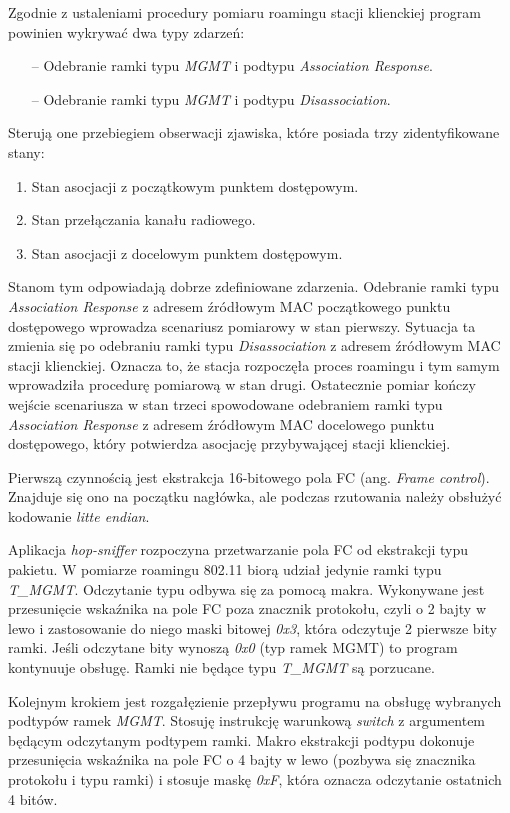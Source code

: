 Zgodnie z ustaleniami procedury pomiaru roamingu stacji klienckiej program powinien wykrywać dwa typy zdarzeń:
\begin{itemize}
\item[--] Odebranie ramki typu \emph{MGMT} i podtypu \emph{Association Response}.
\item[--] Odebranie ramki typu \emph{MGMT} i podtypu \emph{Disassociation}.
\end{itemize}
Sterują one przebiegiem obserwacji zjawiska, które posiada trzy zidentyfikowane stany:
\begin{enumerate}
\item Stan asocjacji z początkowym punktem dostępowym.
\item Stan przełączania kanału radiowego.
\item Stan asocjacji z docelowym punktem dostępowym.
\end{enumerate}
Stanom tym odpowiadają dobrze zdefiniowane zdarzenia. Odebranie ramki typu \emph{Association Response} z adresem źródłowym MAC początkowego punktu dostępowego wprowadza scenariusz pomiarowy w stan pierwszy. Sytuacja ta zmienia się po odebraniu ramki typu \emph{Disassociation} z adresem źródłowym MAC stacji klienckiej. Oznacza to, że stacja rozpoczęła proces roamingu i tym samym wprowadziła procedurę pomiarową w stan drugi. Ostatecznie pomiar kończy wejście scenariusza w stan trzeci spowodowane odebraniem ramki typu \emph{Association Response} z adresem źródłowym MAC docelowego punktu dostępowego, który potwierdza asocjację przybywającej stacji klienckiej.

Pierwszą czynnością jest ekstrakcja 16-bitowego pola FC (ang. \emph{Frame control}). Znajduje się ono na początku nagłówka, ale podczas rzutowania należy obsłużyć kodowanie \emph{litte endian}.

Aplikacja \emph{hop-sniffer} rozpoczyna przetwarzanie pola FC od ekstrakcji typu pakietu. W pomiarze roamingu 802.11 biorą udział jedynie ramki typu \emph{T\_MGMT}. Odczytanie typu odbywa się za pomocą makra. Wykonywane jest przesunięcie wskaźnika na pole FC poza znacznik protokołu, czyli o 2 bajty w lewo i zastosowanie do niego maski bitowej \emph{0x3}, która odczytuje 2 pierwsze bity ramki. Jeśli odczytane bity wynoszą \emph{0x0} (typ ramek MGMT) to program kontynuuje obsługę. Ramki nie będące typu \emph{T\_MGMT} są porzucane. 

Kolejnym krokiem jest rozgałęzienie przepływu programu na obsługę wybranych podtypów ramek \emph{MGMT}. Stosuję instrukcję warunkową \emph{switch} z argumentem będącym odczytanym podtypem ramki. Makro ekstrakcji podtypu dokonuje przesunięcia wskaźnika na pole FC o 4 bajty w lewo (pozbywa się znacznika protokołu i typu ramki) i stosuje maskę \emph{0xF}, która oznacza odczytanie ostatnich 4 bitów.

